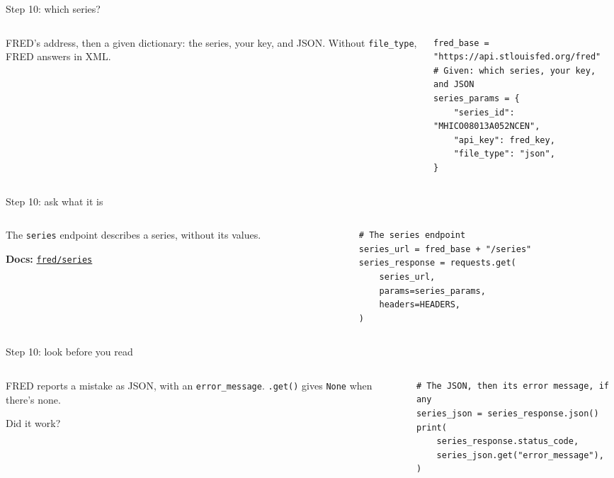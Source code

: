 \documentclass[9pt,aspectratio=169]{beamer}
\begin{document}
\begin{frame}[fragile]{Step 10: which series?}
    \begin{columns}[T]
        \begin{column}{0.37\textwidth}
            FRED's address, then a given dictionary: the series, your key, and JSON. Without \texttt{file\_type}, FRED answers in XML.
        \end{column}
        \begin{column}{0.6\textwidth}
\begin{lstlisting}
fred_base = "https://api.stlouisfed.org/fred"
# Given: which series, your key, and JSON
series_params = {
    "series_id": "MHICO08013A052NCEN",
    "api_key": fred_key,
    "file_type": "json",
}
\end{lstlisting}
        \end{column}
    \end{columns}
\end{frame}

\begin{frame}[fragile]{Step 10: ask what it is}
    \begin{columns}[T]
        \begin{column}{0.37\textwidth}
            The \texttt{series} endpoint describes a series, without its values.

            \medskip
            {\scriptsize\textbf{Docs:} \href{https://fred.stlouisfed.org/docs/api/fred/series.html}{\texttt{fred/series}}\par}
        \end{column}
        \begin{column}{0.6\textwidth}
\begin{lstlisting}
# The series endpoint
series_url = fred_base + "/series"
series_response = requests.get(
    series_url,
    params=series_params,
    headers=HEADERS,
)
\end{lstlisting}
        \end{column}
    \end{columns}
\end{frame}

\begin{frame}[fragile]{Step 10: look before you read}
    \begin{columns}[T]
        \begin{column}{0.37\textwidth}
            FRED reports a mistake as JSON, with an \texttt{error\_message}. \texttt{.get()} gives \texttt{None} when there's none.

            \medskip
            Did it work?
        \end{column}
        \begin{column}{0.6\textwidth}
\begin{lstlisting}
# The JSON, then its error message, if any
series_json = series_response.json()
print(
    series_response.status_code,
    series_json.get("error_message"),
)
\end{lstlisting}
        \end{column}
    \end{columns}
\end{frame}
\end{document}
